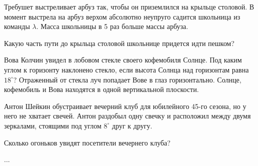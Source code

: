 


%

Требушет выстреливает арбуз так, чтобы он приземлился на крыльце столовой. 
В момент выстрела на арбуз верхом абсолютно неупруго садится школьница из команды $\lambda$. 
Масса школьницы в 5 раз больше массы арбуза. 

Какую часть пути до крыльца столовой школьнице придется идти пешком?



% 


%











Вова Колчин увидел в лобовом стекле своего кофемобиля Солнце. 
Под каким углом к горизонту наклонено стекло, если высота Солнца над горизонтам равна $18^\circ$? 
Отраженный от стекла луч попадает Вове в глаз горизонтально. 
Солнце, кофемобиль и Вова находятся в одной вертикальной плоскости.


Антон Шейкин обустраивает вечерний клуб для юбилейного 45-го сезона, но у него не хватает свечей. 
Антон раздобыл одну свечку и расположил между двумя зеркалами, стоящими под углом $8^\circ$ друг к другу.

Сколько огоньков увидят посетители вечернего клуба?









...

